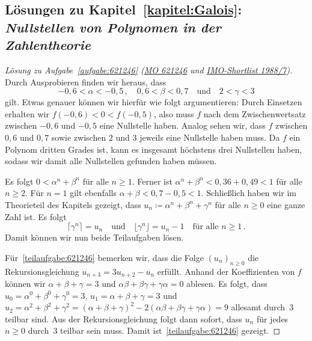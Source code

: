 \subsection*{Lösungen zu Kapitel~\ref{kapitel:Galois}: \emph{Nullstellen von Polynomen in der Zahlentheorie}}

\begin{proof}[Lösung zu Aufgabe~\ref{aufgabe:621246} \textmd{(\href{https://www.mathematik-olympiaden.de/moev/index.php?option=com_download&thema=a&datei=A62124b.pdf&format=raw}{MO 621246} und \href{https://artofproblemsolving.com/community/c3939_1988_imo_shortlist}{IMO-Shortlist 1988/7})}]
	Durch Ausprobieren finden wir heraus, dass
	\begin{equation*}
		-0{,}6<\alpha<-0{,}5\,,\quad 0{,}6<\beta<0{,}7\quad\text{und}\quad 2<\gamma <3
	\end{equation*}
	gilt. Etwas genauer können wir hierfür wie folgt argumentieren: Durch Einsetzen erhalten wir $f(-0{,}6)<0<f(-0{,}5)$, also muss $f$ nach dem Zwischenwertsatz zwischen $-0{,}6$ und $-0{,}5$ eine Nullstelle haben. Analog sehen wir, dass $f$ zwischen $0{,}6$ und $0{,}7$ sowie zwischen $2$ und $3$ jeweils eine Nullstelle haben muss. Da $f$ ein Polynom dritten Grades ist, kann es insgesamt höchstens drei Nullstellen haben, sodass wir damit alle Nullstellen gefunden haben müssen.
	
	Es folgt $0<\alpha^n+\beta^n$ für alle $n\geqslant 1$. Ferner ist $\alpha^n+\beta^n<0{,}36+0{,}49<1$ für alle $n\geqslant 2$. Für $n=1$ gilt ebenfalls $\alpha+\beta <0{,7} -0{,}5<1$. Schließlich haben wir im Theorieteil des Kapitels gezeigt, dass $u_n\coloneqq \alpha^n+\beta^n+\gamma^n$ für alle $n\geqslant 0$ eine ganze Zahl ist. Es folgt
	\begin{equation*}
		\lceil \gamma^n\rceil=u_n\quad\text{und}\quad\lfloor \gamma^n\rfloor =u_n-1\quad \text{für alle }n\geqslant 1\,.
	\end{equation*}
	Damit können wir nun beide Teilaufgaben lösen.
	
	Für~\ref{teilaufgabe:621246} bemerken wir, dass die Folge $(u_n)_{n\geqslant 0}$ die Rekursionsgleichung $u_{n+3}=3u_{n+2}-u_n$ erfüllt. Anhand der Koeffizienten von $f$ können wir $\alpha+\beta+\gamma=3$ und $\alpha\beta+\beta\gamma+\gamma\alpha=0$ ablesen. Es folgt, dass $u_0=\alpha^0+\beta^0+\gamma^0=3$, $u_1=\alpha+\beta+\gamma=3$ und $u_2=\alpha^2+\beta^2+\gamma^2=(\alpha+\beta+\gamma)^2-2(\alpha\beta+\beta\gamma+\gamma\alpha)=9$ allesamt durch~$3$ teilbar sind. Aus der Rekursionsgleichung folgt dann sofort, dass $u_n$ für jedes $n\geqslant 0$ durch~$3$ teilbar sein muss. Damit ist~\ref{teilaufgabe:621246} gezeigt.
	

\end{proof}
